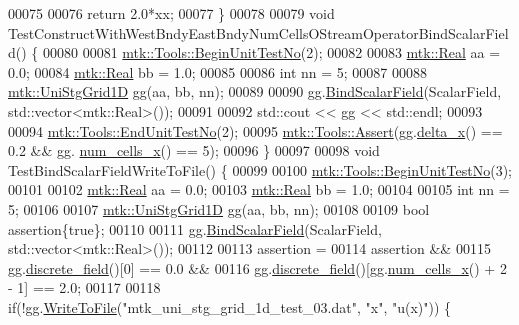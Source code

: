 \begin{DoxyCode}
00075 
00076   \textcolor{keywordflow}{return} 2.0*xx;
00077 \}
00078 
00079 \textcolor{keywordtype}{void} TestConstructWithWestBndyEastBndyNumCellsOStreamOperatorBindScalarField() \{
00080 
00081   \hyperlink{classmtk_1_1Tools_afc29ecaf337a13ed2e817d3890a5a441}{mtk::Tools::BeginUnitTestNo}(2);
00082 
00083   \hyperlink{group__c01-roots_gac080bbbf5cbb5502c9f00405f894857d}{mtk::Real} aa = 0.0;
00084   \hyperlink{group__c01-roots_gac080bbbf5cbb5502c9f00405f894857d}{mtk::Real} bb = 1.0;
00085 
00086   \textcolor{keywordtype}{int} nn = 5;
00087 
00088   \hyperlink{classmtk_1_1UniStgGrid1D}{mtk::UniStgGrid1D} gg(aa, bb, nn);
00089 
00090   gg.\hyperlink{classmtk_1_1UniStgGrid1D_a6ad3040de719dff71d934f0062e9860f}{BindScalarField}(ScalarField, std::vector<mtk::Real>());
00091 
00092   std::cout << gg << std::endl;
00093 
00094   \hyperlink{classmtk_1_1Tools_aba67d9dc35c9c1c49430fcc9ea035e03}{mtk::Tools::EndUnitTestNo}(2);
00095   \hyperlink{classmtk_1_1Tools_ac6804df469c94ab6a796fb64f1e44a89}{mtk::Tools::Assert}(gg.\hyperlink{classmtk_1_1UniStgGrid1D_a6e7173b01241632cf509496d66b9f74c}{delta\_x}() == 0.2 && gg.
      \hyperlink{classmtk_1_1UniStgGrid1D_af1b3729d8afa07be5b2775ed68015b80}{num\_cells\_x}() == 5);
00096 \}
00097 
00098 \textcolor{keywordtype}{void} TestBindScalarFieldWriteToFile() \{
00099 
00100   \hyperlink{classmtk_1_1Tools_afc29ecaf337a13ed2e817d3890a5a441}{mtk::Tools::BeginUnitTestNo}(3);
00101 
00102   \hyperlink{group__c01-roots_gac080bbbf5cbb5502c9f00405f894857d}{mtk::Real} aa = 0.0;
00103   \hyperlink{group__c01-roots_gac080bbbf5cbb5502c9f00405f894857d}{mtk::Real} bb = 1.0;
00104 
00105   \textcolor{keywordtype}{int} nn = 5;
00106 
00107   \hyperlink{classmtk_1_1UniStgGrid1D}{mtk::UniStgGrid1D} gg(aa, bb, nn);
00108 
00109   \textcolor{keywordtype}{bool} assertion\{\textcolor{keyword}{true}\};
00110 
00111   gg.\hyperlink{classmtk_1_1UniStgGrid1D_a6ad3040de719dff71d934f0062e9860f}{BindScalarField}(ScalarField, std::vector<mtk::Real>());
00112 
00113   assertion =
00114     assertion &&
00115     gg.\hyperlink{classmtk_1_1UniStgGrid1D_ab9c3f9ee2ac76a351b01e4abfede4d19}{discrete\_field}()[0] == 0.0 &&
00116     gg.\hyperlink{classmtk_1_1UniStgGrid1D_ab9c3f9ee2ac76a351b01e4abfede4d19}{discrete\_field}()[gg.\hyperlink{classmtk_1_1UniStgGrid1D_af1b3729d8afa07be5b2775ed68015b80}{num\_cells\_x}() + 2 - 1] == 2.0;
00117 
00118   \textcolor{keywordflow}{if}(!gg.\hyperlink{classmtk_1_1UniStgGrid1D_a6d2c10aa9468a037829f0eb043b898dc}{WriteToFile}(\textcolor{stringliteral}{"mtk\_uni\_stg\_grid\_1d\_test\_03.dat"}, \textcolor{stringliteral}{"x"}, \textcolor{stringliteral}{"u(x)"})) \{

\end{DoxyCode}
